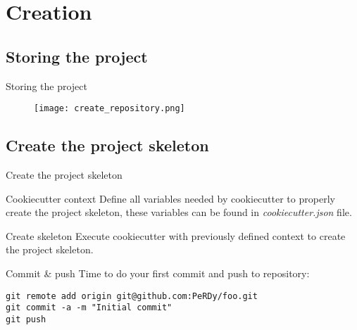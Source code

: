 \section{Creation}
\subsection{Storing the project}
\begin{frame}{Storing the project}
    \begin{figure}
        \texttt{[image: create\_repository.png]}
    \end{figure}
\end{frame}

\subsection{Create the project skeleton}
\begin{frame}[fragile]{Create the project skeleton}
    \begin{block}{Cookiecutter context}
        Define all variables needed by cookiecutter to properly create the project skeleton, these variables can be found in \textit{cookiecutter.json} file.
    \end{block}
    \pause
    \begin{block}{Create skeleton}
        Execute cookiecutter with previously defined context to create the project skeleton.
    \end{block}
    \pause
    \begin{block}{Commit \& push}
        Time to do your first commit and push to repository:
        \begin{verbatim}
git remote add origin git@github.com:PeRDy/foo.git
git commit -a -m "Initial commit"
git push
        \end{verbatim}
    \end{block}
\end{frame}

